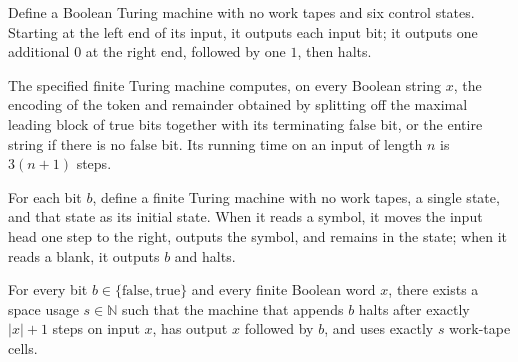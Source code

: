 \begin{definition}
\label{Turing.FinTM.unaryTokenTM}
\leanok
{}
Define a Boolean Turing machine with no work tapes and six control states. Starting at
the left end of its input, it outputs each input bit; it outputs one additional $0$ at
the right end, followed by one $1$, then halts.
\end{definition}

\begin{theorem}
\label{Turing.FinTM.unaryTokenTM_computes}
\leanok
{}
The specified finite Turing machine computes, on every Boolean string $x$, the encoding
of the token and remainder obtained by splitting off the maximal leading block of true
bits together with its terminating false bit, or the entire string if there is no false
bit. Its running time on an input of length $n$ is $3(n+1)$ steps.
\end{theorem}

\begin{definition}
\label{Turing.FinTM.appendBitTM}
\leanok
{}
For each bit $b$, define a finite Turing machine with no work tapes, a single state, and
that state as its initial state. When it reads a symbol, it moves the input head one
step to the right, outputs the symbol, and remains in the state; when it reads a blank,
it outputs $b$ and halts.
\end{definition}

\begin{theorem}
\label{Turing.FinTM.appendBitTM_computes}
\leanok
{}
For every bit $b \in \{\mathrm{false},\mathrm{true}\}$ and every finite Boolean word
$x$, there exists a space usage $s \in \mathbb{N}$ such that the machine that appends
$b$ halts after exactly $|x|+1$ steps on input $x$, has output $x$ followed by $b$, and
uses exactly $s$ work-tape cells.
\end{theorem}
